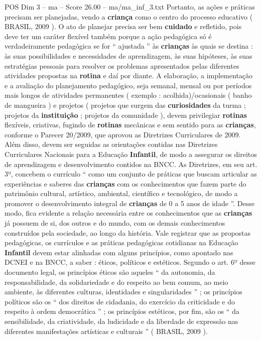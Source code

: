 \begin{textsample}{POS Dim 3 – ma – Score 26.00 – ma/ma\_inf\_3.txt}
Portanto, as ações e práticas precisam ser planejadas, vendo a \textbf{criança} como o centro do processo educativo ( BRASIL, 2009 ).
O ato de planejar precisa ser bem \textbf{cuidado} e refletido, pois deve ter um caráter flexível também porque a ação pedagógica só é verdadeiramente pedagógica se for “ ajustada ” às \textbf{crianças} às quais se destina : às suas possibilidades e necessidades de aprendizagem, às suas hipóteses, às suas estratégias pessoais para resolver os problemas apresentados pelas diferentes atividades propostas na \textbf{rotina} e daí por diante.
A elaboração, a implementação e a avaliação do planejamento pedagógico, seja semanal, mensal ou por períodos mais longos de atividades permanentes ( exemplo : acolhida)/ocasionais ( banho de mangueira ) e projetos ( projetos que surgem das \textbf{curiosidades} da turma ; projetos da \textbf{instituição} ; projetos da comunidade ), devem privilegiar \textbf{rotinas} flexíveis, criativas, fugindo de \textbf{rotinas} mecânicas e sem sentido para as \textbf{crianças}, conforme o Parecer 20/2009, que aprovou as Diretrizes Curriculares de 2009.
Além disso, devem ser seguidas as orientações contidas nas Diretrizes Curriculares Nacionais para a Educação \textbf{Infantil}, de modo a assegurar os direitos de aprendizagem e desenvolvimento contidos na BNCC.
As Diretrizes, em seu art. 3º, concebem o currículo “ como um conjunto de práticas que buscam articular as experiências e saberes das \textbf{crianças} com os conhecimentos que fazem parte do patrimônio cultural, artístico, ambiental, científico e tecnológico, de modo a promover o desenvolvimento integral de \textbf{crianças} de 0 a 5 anos de idade ”.
Desse modo, fica evidente a relação necessária entre os conhecimentos que as \textbf{crianças} já possuem de si, dos outros e do mundo, com os demais conhecimentos construídos pela sociedade, ao longo da história.
Vale registrar que as propostas pedagógicas, os currículos e as práticas pedagógicas cotidianas na Educação \textbf{Infantil} devem estar alinhadas com alguns princípios, como apontado nas DCNEI e na BNCC, a saber : éticos, políticos e estéticos.
Segundo o art. 6º desse documento legal, os princípios éticos são aqueles “ da autonomia, da responsabilidade, da solidariedade e do respeito ao bem comum, ao meio ambiente, às diferentes culturas, identidades e singularidades ” ; os princípios políticos são os “ dos direitos de cidadania, do exercício da criticidade e do respeito à ordem democrática ” ; os princípios estéticos, por fim, são os “ da sensibilidade, da criatividade, da ludicidade e da liberdade de expressão nas diferentes manifestações artísticas e culturais ” ( BRASIL, 2009 ).

\end{textsample}

